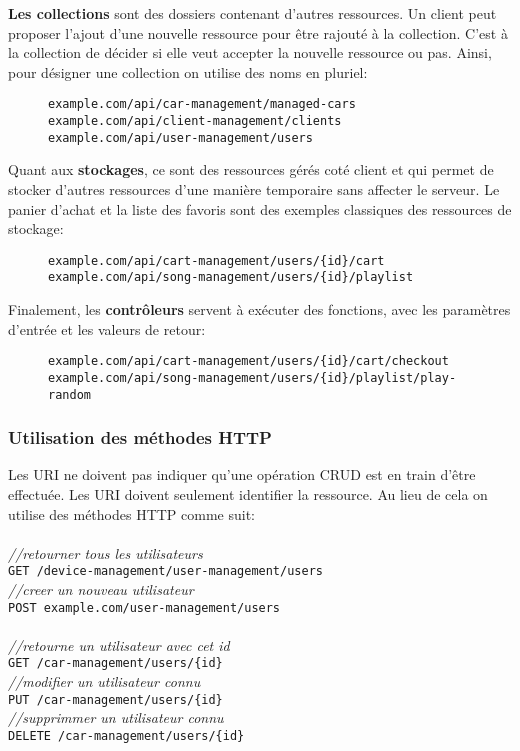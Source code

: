 \textbf{Les collections} sont des dossiers contenant d'autres ressources. Un client peut proposer l'ajout d'une nouvelle ressource pour être rajouté à la collection. C'est à la collection de décider si elle veut accepter la nouvelle ressource ou pas. Ainsi, pour désigner une collection on utilise des noms en pluriel: 
\begin{figure}[h!]
	\begin{lstlisting}[frame=single]
example.com/api/car-management/managed-cars
example.com/api/client-management/clients
example.com/api/user-management/users
	\end{lstlisting}
\end{figure}

Quant aux \textbf{stockages}, ce sont des ressources gérés coté client et qui permet de stocker d'autres ressources d'une manière temporaire sans affecter le serveur. Le panier d'achat et la liste des favoris sont des exemples classiques des ressources de stockage: 
\begin{figure}[h!]
	\begin{lstlisting}[frame=single]
example.com/api/cart-management/users/{id}/cart
example.com/api/song-management/users/{id}/playlist
	\end{lstlisting}
\end{figure}

Finalement, les \textbf{contrôleurs} servent à exécuter des fonctions, avec les paramètres d'entrée et les valeurs de retour: 
\begin{figure}[h!]
	\begin{lstlisting}[frame=single]
example.com/api/cart-management/users/{id}/cart/checkout
example.com/api/song-management/users/{id}/playlist/play-random
	\end{lstlisting}
\end{figure}

\subsubsection{Utilisation des méthodes HTTP}
Les URI ne doivent pas indiquer qu'une opération CRUD est en train d'être effectuée. Les URI doivent seulement identifier la ressource. Au lieu de cela on utilise des méthodes HTTP comme suit: \\
\\
\emph{//retourner tous les utilisateurs\\}
\verb|GET /device-management/user-management/users|\\
\emph{//creer un nouveau utilisateur\\}
\verb|POST example.com/user-management/users|
\\
\\
\emph{//retourne un utilisateur avec cet id\\}
\verb|GET /car-management/users/{id}|\\
\emph{//modifier un utilisateur connu\\}
\verb|PUT /car-management/users/{id}|\\
\emph{//supprimmer un utilisateur connu\\}
\verb|DELETE /car-management/users/{id}|\\



